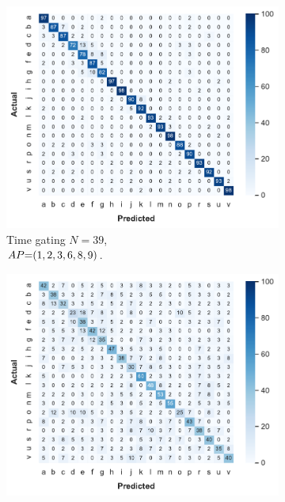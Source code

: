 \begin{figure}
  \centering
  \begin{subfigure}{.69\linewidth}
      \includegraphics[width=\linewidth]{Figures/RadarExperiments/Datasets/20Gestures/Results/All/Mixed-time-gating-cm.pdf}
      \vspace{-12pt}
      \caption{Time gating $N{=}39$, \\ $\splitatcommas{AP{=}(1, 2, 3, 6, 8, 9)}$.}
      \vspace{6pt}
      \label{fig:radar-experiments:confusion-exp1-Mixed-timegating}
  \end{subfigure}
  \begin{subfigure}{.69\linewidth}
      \includegraphics[width=\linewidth]{Figures/RadarExperiments/Datasets/20Gestures/Results/All/mixed-filtering-cm.pdf}

\end{subfigure}
\end{figure}
